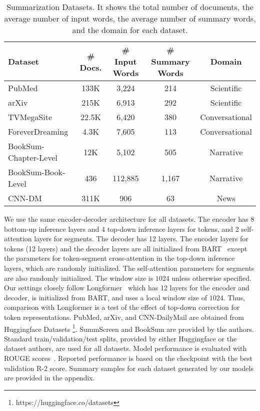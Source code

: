 \begin{table*}[h!]
\small
\centering
\begin{tabular}{l c c c c} 
\toprule
Dataset & \# Docs. & \# Input Words & \# Summary Words & Domain\\
\hline
PubMed &133K & 3,224 & 214 & Scientific \\ 
arXiv &215K & 6,913 & 292 & Scientific \\ 
TVMegaSite & 22.5K & 6,420 & 380 & Conversational \\
ForeverDreaming & 4.3K & 7,605 & 113  & Conversational \\
BookSum-Chapter-Level & 12K & 5,102 & 505 & Narrative \\
BookSum-Book-Level & 436 & 112,885 & 1,167 & Narrative \\
CNN-DM & 311K & 906 & 63 & News \\ 
\hline
\end{tabular}
\caption{\scriptsize Summarization Datasets. It shows the total number of documents, the average number of input words, the average number of summary words, and the domain for each dataset.}
\label{table:datasets}
\end{table*}

We use the same encoder-decoder architecture for all datasets. The encoder has 8 bottom-up inference layers and 4 top-down inference layers for tokens, and 2 self-attention layers for segments. The decoder has 12 layers. The encoder layers for tokens (12 layers) and the decoder layers are all initialized from BART~\citep{lewis-etal-2020-bart} except the parameters for token-segment cross-attention in the top-down inference layers, which are randomly initialized. The self-attention parameters for segments are also randomly initialized. The window size is $1024$ unless otherwise specified. Our settings closely follow Longformer~\citep{beltagy2020longformer} which has 12 layers for the encoder and decoder, is initialized from BART, and uses a local window size of $1024$. Thus, comparison with Longformer is a test of the effect of top-down correction for token representations. PubMed, arXiv, and CNN-DailyMail are obtained from Huggingface Datasets \footnote{https://huggingface.co/datasets}. SummScreen and BookSum are provided by the authors. Standard train/validation/test splits, provided by either Huggingface or the dataset authors, are used for all datasets. Model performance is evaluated with ROUGE scores~\citep{lin-2004-rouge}. Reported performance is based on the checkpoint with the best validation R-2 score. Summary samples for each dataset generated by our models are provided in the appendix. 

